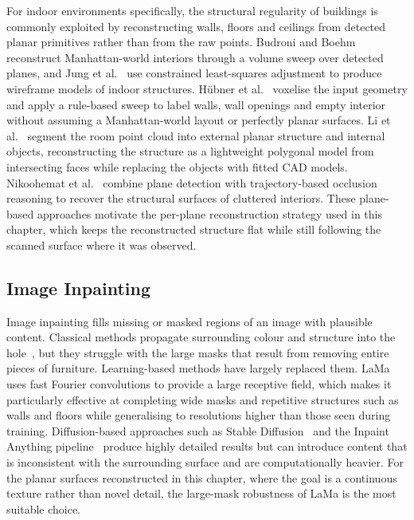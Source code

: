 For indoor environments specifically, the structural regularity of buildings is commonly exploited by reconstructing walls, floors and ceilings from detected planar primitives rather than from the raw points. Budroni and Boehm~\cite{budroni_automatic_2010} reconstruct Manhattan-world interiors through a volume sweep over detected planes, and Jung et al.~\cite{jung_automated_2016} use constrained least-squares adjustment to produce wireframe models of indoor structures. Hübner et al.~\cite{hubner_voxel-based_2020} voxelise the input geometry and apply a rule-based sweep to label walls, wall openings and empty interior without assuming a Manhattan-world layout or perfectly planar surfaces. Li et al.~\cite{li_hybrid_2024} segment the room point cloud into external planar structure and internal objects, reconstructing the structure as a lightweight polygonal model from intersecting faces while replacing the objects with fitted CAD models. Nikoohemat et al.~\cite{nikoohemat_exploiting_2017, nikoohemat_change_2018} combine plane detection with trajectory-based occlusion reasoning to recover the structural surfaces of cluttered interiors. These plane-based approaches motivate the per-plane reconstruction strategy used in this chapter, which keeps the reconstructed structure flat while still following the scanned surface where it was observed.


\subsection{Image Inpainting}
\label{sec:6_rw_inpainting}

Image inpainting fills missing or masked regions of an image with plausible content. Classical methods propagate surrounding colour and structure into the hole~\cite{galerne_texture_2017, maggiordomo_texture_2023}, but they struggle with the large masks that result from removing entire pieces of furniture. Learning-based methods have largely replaced them. LaMa~\cite{suvorov_resolution-robust_2022} uses fast Fourier convolutions to provide a large receptive field, which makes it particularly effective at completing wide masks and repetitive structures such as walls and floors while generalising to resolutions higher than those seen during training. Diffusion-based approaches such as Stable Diffusion~\cite{rombach_high-resolution_2021} and the Inpaint Anything pipeline~\cite{yu_inpaint_2023} produce highly detailed results but can introduce content that is inconsistent with the surrounding surface and are computationally heavier. For the planar surfaces reconstructed in this chapter, where the goal is a continuous texture rather than novel detail, the large-mask robustness of LaMa is the most suitable choice.


